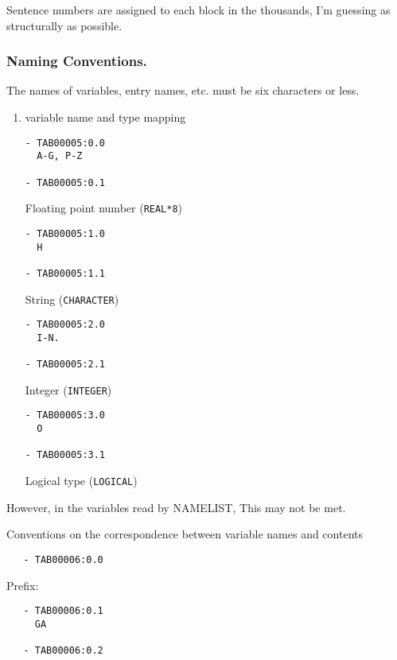 Sentence numbers are assigned to each block in the thousands, I'm
guessing as structurally as possible.

\hypertarget{naming-conventions.}{%
\subsubsection{Naming Conventions.}\label{naming-conventions.}}

The names of variables, entry names, etc. must be six characters or
less.

\begin{enumerate}
\def\labelenumi{\arabic{enumi}.}
\setcounter{enumi}{1}
\item
  variable name and type mapping

\begin{verbatim}
- TAB00005:0.0 
  A-G, P-Z

- TAB00005:0.1 
\end{verbatim}

  Floating point number ({\texttt{REAL*8}})

\begin{verbatim}
- TAB00005:1.0 
  H

- TAB00005:1.1 
\end{verbatim}

  String ({\texttt{CHARACTER}})

\begin{verbatim}
- TAB00005:2.0 
  I-N.

- TAB00005:2.1 
\end{verbatim}

  Integer ({\texttt{INTEGER}})

\begin{verbatim}
- TAB00005:3.0 
  O

- TAB00005:3.1 
\end{verbatim}

  Logical type ({\texttt{LOGICAL}})
\end{enumerate}

However, in the variables read by NAMELIST, This may not be met.

Conventions on the correspondence between variable names and contents

\begin{verbatim}
   - TAB00006:0.0 
\end{verbatim}

Prefix:

\begin{verbatim}
   - TAB00006:0.1 
     GA
 
   - TAB00006:0.2 
\end{verbatim}

